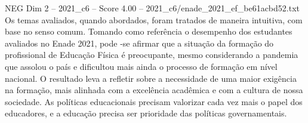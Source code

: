 \begin{textsample}{NEG Dim 2 – 2021\_c6 – Score 4.00 – 2021\_c6/enade\_2021\_ef\_be61acbd52.txt}
Os temas avaliados, quando abordados, foram tratados de maneira intuitiva, com base no senso comum.
Tomando como referência o desempenho dos estudantes avaliados no Enade 2021, pode -se afirmar que a situação da formação do profissional de Educação Física é preocupante, mesmo considerando a pandemia que assolou o país e dificultou mais ainda o processo de formação em nível nacional.
O resultado leva a refletir sobre a necessidade de uma maior exigência na formação, mais alinhada com a excelência acadêmica e com a cultura de nossa sociedade.
As políticas educacionais precisam valorizar cada vez mais o papel dos educadores, e a educação precisa ser prioridade das políticas governamentais.

\end{textsample}
